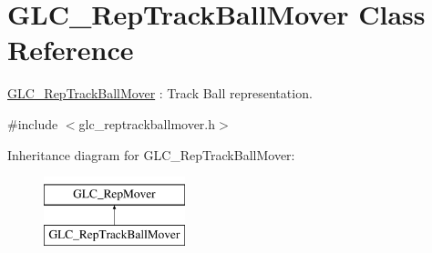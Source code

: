\hypertarget{class_g_l_c___rep_track_ball_mover}{\section{G\-L\-C\-\_\-\-Rep\-Track\-Ball\-Mover Class Reference}
\label{class_g_l_c___rep_track_ball_mover}
}


\hyperlink{class_g_l_c___rep_track_ball_mover}{G\-L\-C\-\_\-\-Rep\-Track\-Ball\-Mover} \-: Track Ball representation.  




{\ttfamily \#include $<$glc\-\_\-reptrackballmover.\-h$>$}

Inheritance diagram for G\-L\-C\-\_\-\-Rep\-Track\-Ball\-Mover\-:\begin{figure}[H]
\begin{center}
\leavevmode
\includegraphics[height=2.000000cm]{class_g_l_c___rep_track_ball_mover}
\end{center}
\end{figure}
